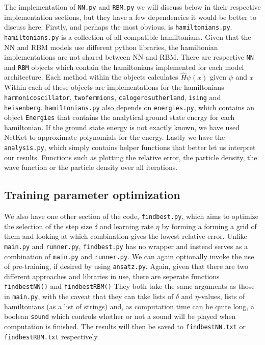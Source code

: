 \documentclass[12pt]{article}
\begin{document}
{The implementation of \texttt{NN.py} and \texttt{RBM.py} we will discuss below in their respective implementation sections, but they have a few dependencies it would be better to discuss here:
\newline
Firstly, and perhaps the most obvious, is \texttt{hamiltonians.py}. \texttt{hamiltonians.py} is a collection of all compatible hamiltonians. Given that the NN and RBM models use different python libraries, the hamiltonian implementations are not shared between NN and RBM. There are respective \texttt{NN} and \texttt{RBM} objects which contain the hamiltonians implemented for each model architecture. Each method within the objects calculates $\hat H \psi(x)$ given $\psi$ and $x$ \newline 
Within each of these objects are implementations for the hamiltonians \newline \texttt{harmonic\textunderscore oscillator}, \texttt{two\textunderscore fermions}, \texttt{calogero\textunderscore sutherland}, \texttt{ising} and \texttt{heisenberg}. \newline \texttt{hamiltonians.py} also depends on \texttt{energies.py}, which contains an object \texttt{Energies} that contains the analytical ground state energy for each hamiltonian. If the ground state energy is not exactly known, we have used NetKet to approximate polynomials for the energy. \newline
Lastly we have the \texttt{analysis.py}, which simply contains helper functions that better let us interpret our results. Functions such as plotting the relative error, the particle density, the wave function or the particle density over all iterations.
\subsection{Training parameter optimization}
We also have one other section of the code, \texttt{findbest.py}, which aims to optimize the selection of the step size $\delta$ and learning rate $\eta$ by forming a forming a grid of them and looking at which combination gives the lowest relative error. Unlike \texttt{main.py} and \texttt{runner.py}, \texttt{findbest.py} has no wrapper and instead serves as a combination of \texttt{main.py} and \texttt{runner.py}. We can again optionally invoke the use of pre-training, if desired by using \texttt{ansatz.py}. Again, given that there are two different approaches and libraries in use, there are seperate functions \texttt{findbestNN()} and \texttt{findbestRBM()} They both take the same arguments as those in \texttt{main.py}, with the caveat that they can take lists of $\delta$ and $\eta$-values, lists of hamiltonians (as a list of strings) and, as computation time can be quite long, a boolean \texttt{sound} which controls whether or not a sound will be played when computation is finished. \newline
The results will then be saved to \texttt{findbestNN.txt} or \texttt{findbestRBM.txt} respectively.
}
\end{document}
